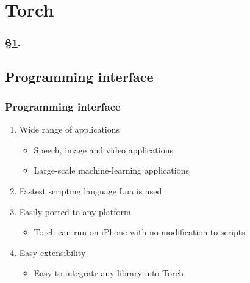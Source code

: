 
\section{Torch}\label{sec:Torch}


\frameinlbffalse

{

\begin{frame}[plain]
\frametitle{\S\ref{sec:Torch}. \insertsection}
\listofframes
\end{frame}
\addtocounter{framenumber}{-1} %

}

\frameinlbftrue

\subsection{Programming interface}

\begin{frame}
  \MyLogo
  \frametitle{Programming interface}  
\begin{enumerate}
\item Wide range of applications
\begin{itemize}
\item Speech, image and video applications
\item  Large-scale machine-learning applications
\end{itemize}
\item Fastest scripting language Lua is used
\item Easily ported to any platform
\begin{itemize}
\item Torch can run on iPhone with no modification to scripts
\end{itemize}
\item Easy extensibility
\begin{itemize}
\item Easy to integrate any library into Torch
\end{itemize}
\end{enumerate}
\end{frame}

